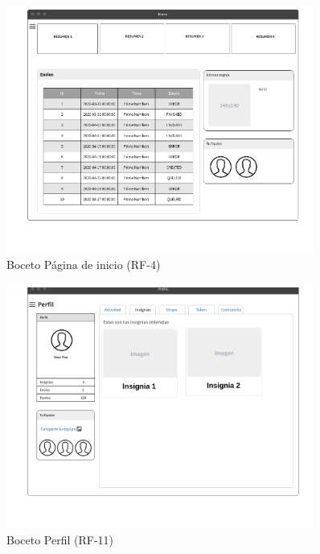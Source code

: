 \documentclass[11pt,spanish,listoffigures,listoftables]{tfgetsinf}
\begin{document}
\begin{figure}[!ht]
	\centering
	\includegraphics[width=0.9\textwidth]{img/wireframe-dashboard}
	\caption[Boceto Página de inicio]{Boceto Página de inicio (RF-4)}
	\label{figura:wireframe-dashboard}
\end{figure}

\begin{figure}[!ht]
	\centering
	\includegraphics[width=0.9\textwidth]{img/wireframe-perfil}
	\caption[Boceto Perfil]{Boceto Perfil (RF-11)}
	\label{figura:wireframe-perfil}
\end{figure}

\FloatBarrier

\end{document}
